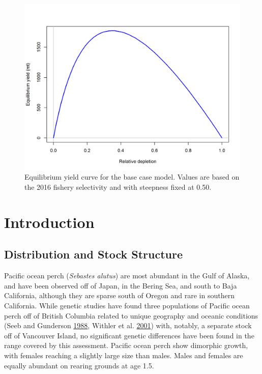 \documentclass[12pt,]{article}
\begin{document}
\FloatBarrier

\begin{figure}
\centering
\includegraphics{r4ss/plots_mod1/yield1_yield_curve.png}
\caption{Equilibrium yield curve for the base case model. Values are
based on the 2016 fishery selectivity and with steepness fixed at 0.50.
\label{fig:Yield_all}}
\end{figure}

\FloatBarrier

\newpage

\renewcommand{\thefigure}{\arabic{figure}}
\renewcommand{\thetable}{\arabic{table}}

\setcounter{figure}{0} \setcounter{table}{0}


\section{Introduction}\label{introduction}

\subsection{Distribution and Stock
Structure}\label{distribution-and-stock-structure}

Pacific ocean perch (\emph{Sebastes alutus}) are most abundant in the
Gulf of Alaska, and have been observed off of Japan, in the Bering Sea,
and south to Baja California, although they are sparse south of Oregon
and rare in southern California. While genetic studies have found three
populations of Pacific ocean perch off of British Columbia related to
unique geography and oceanic conditions (Seeb and Gunderson
\protect\hyperlink{ref-seeb_genetic_1988}{1988}, Withler et al.
\protect\hyperlink{ref-withler_co-existing_2001}{2001}) with, notably, a
separate stock off of Vancouver Island, no significant genetic
differences have been found in the range covered by this assessment.
Pacific ocean perch show dimorphic growth, with females reaching a
slightly large size than males. Males and females are equally abundant
on rearing grounds at age 1.5.
\end{document}
